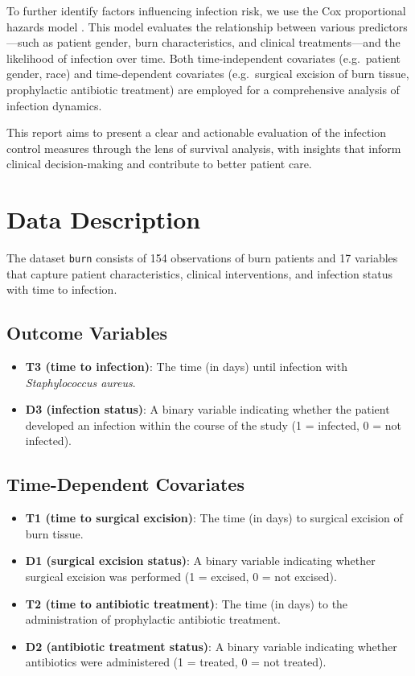 \documentclass[12pt]{article}
\providecommand{\tightlist}{%
  \setlength{\itemsep}{0pt}\setlength{\parskip}{0pt}}
\begin{document}
To further identify factors influencing infection risk, we use the Cox
proportional hazards model \citep{cox1972}. This model evaluates the
relationship between various predictors---such as patient gender, burn
characteristics, and clinical treatments---and the likelihood of
infection over time. Both time-independent covariates (e.g.~patient
gender, race) and time-dependent covariates (e.g.~surgical excision of
burn tissue, prophylactic antibiotic treatment) are employed for a
comprehensive analysis of infection dynamics.

This report aims to present a clear and actionable evaluation of the
infection control measures through the lens of survival analysis, with
insights that inform clinical decision-making and contribute to better
patient care.

\section{Data Description}\label{data-description}

The dataset \texttt{burn} consists of 154 observations of burn patients
and 17 variables that capture patient characteristics, clinical
interventions, and infection status with time to infection.

\subsection{\texorpdfstring{\textbf{Outcome
Variables}}{Outcome Variables}}\label{outcome-variables}

\begin{itemize}
\tightlist
\item
  \textbf{T3 (time to infection)}: The time (in days) until infection
  with \emph{Staphylococcus aureus}.
\item
  \textbf{D3 (infection status)}: A binary variable indicating whether
  the patient developed an infection within the course of the study (1 =
  infected, 0 = not infected).
\end{itemize}

\subsection{\texorpdfstring{\textbf{Time-Dependent
Covariates}}{Time-Dependent Covariates}}\label{time-dependent-covariates}

\begin{itemize}
\tightlist
\item
  \textbf{T1 (time to surgical excision)}: The time (in days) to
  surgical excision of burn tissue.
\item
  \textbf{D1 (surgical excision status)}: A binary variable indicating
  whether surgical excision was performed (1 = excised, 0 = not
  excised).
\item
  \textbf{T2 (time to antibiotic treatment)}: The time (in days) to the
  administration of prophylactic antibiotic treatment.
\item
  \textbf{D2 (antibiotic treatment status)}: A binary variable
  indicating whether antibiotics were administered (1 = treated, 0 = not
  treated).
\end{itemize}
\end{document}
